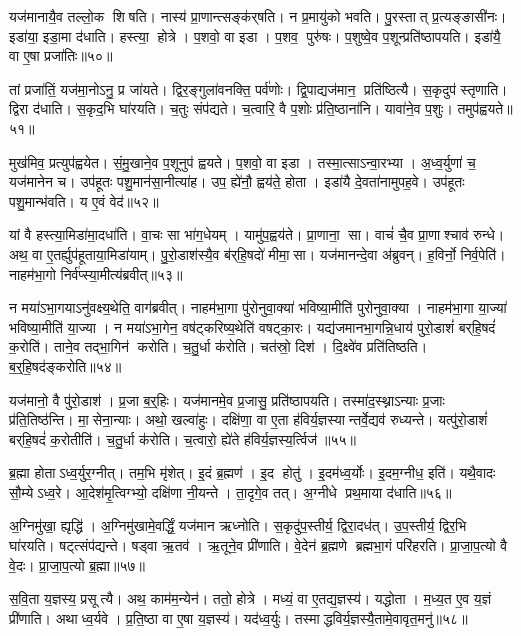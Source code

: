 यज॑मानायै॒व तल्लो॒क शिषति। नास्य॑ प्रा॒णान्त्सङ्क॑र्‌षति। न प्र॒मायु॑को भवति। पु॒रस्तात् प्र॒त्यङ्ङासी॑नः। इडा॑या॒ इडा॒मा द॑धाति। हस्त्या॒ होत्रे। प॒शवो॒ वा इडा। प॒शव॒ पुरु॑षः। प॒शुष्वे॒व प॒शून्प्रति॑ष्ठापयति। इडा॑यै॒ वा ए॒षा प्रजा॑तिः॥५०॥

तां प्रजा॑तिं॒ यज॑मा॒नोऽनु॒ प्र जा॑यते। द्विर॒ङ्गुला॑वनक्ति॒ पर्व॑णोः। द्वि॒पाद्यज॑मान॒ प्रति॑ष्ठित्यै। स॒कृदुप॑ स्तृणाति। द्विरा द॑धाति। स॒कृद॒भि घा॑रयति। च॒तुः संप॑द्यते। च॒त्वारि॒ वै प॒शोः प्र॑ति॒ष्ठाना॑नि। यावा॑ने॒व प॒शुः। तमुप॑ह्वयते॥५१॥

मुख॑मिव॒ प्रत्युप॑ह्वयेत। सं॒मु॒खाने॒व प॒शूनुप॑ ह्वयते। प॒शवो॒ वा इडा। तस्मा॒त्साऽन्वा॒रभ्या। अ॒ध्व॒र्युणा॑ च॒ यज॑मानेन च। उप॑हूतः पशु॒मान॑सा॒नीत्या॑ह। उप॒ ह्ये॑नौ॒ ह्वय॑ते॒ होता। इडा॑यै दे॒वता॑नामुपह॒वे। उप॑हूतः पशु॒मान्भ॑वति। य ए॒वं वेद॑॥५२॥

यां वै हस्त्या॒मिडा॑मा॒दधा॑ति। वा॒चः सा भा॑ग॒धेयम्। यामु॑प॒ह्वय॑ते। प्रा॒णाना॒ सा। वाचं॑ चै॒व प्रा॒णाश्चाव॑ रुन्धे। अथ॒ वा ए॒तर्ह्युप॑हूताया॒मिडा॑याम्। पु॒रो॒डाश॑स्यै॒व ब॑र्‌हि॒षदो॑ मीमा॒सा। यज॑मानन्दे॒वा अ॑ब्रुवन्। ह॒विर्नो॒ निर्व॒पेति॑। नाहम॑भा॒गो निर्व॑प्स्या॒मीत्य॑ब्रवीत्॥५३॥

न मया॑ऽभा॒गयाऽनु॑वक्ष्य॒थेति॒ वाग॑ब्रवीत्। नाहम॑भा॒गा पु॑रोनुवा॒क्या॑ भविष्या॒मीति॑ पुरोनुवा॒क्या। नाहम॑भा॒गा या॒ज्या॑ भविष्या॒मीति॑ या॒ज्या। न मया॑ऽभा॒गेन॒ वष॑ट्करिष्य॒थेति॑ वषट्का॒रः। यद्य॑जमानभा॒गन्नि॒धाय॑ पुरो॒डाशं॑ बर्‌हि॒षदं॑ क॒रोति॑। ताने॒व तद्भा॒गिन॑ करोति। च॒तु॒र्धा क॑रोति। चत॑स्रो॒ दिश॑। दि॒क्ष्वे॑व प्रति॑तिष्ठति। ब॒र्॒हि॒षद॑ङ्करोति॥५४॥

यज॑मानो॒ वै पु॑रो॒डाश॑। प्र॒जा ब॒र्॒हिः। यज॑मानमे॒व प्र॒जासु॒ प्रति॑ष्ठापयति। तस्मा॑द॒स्थ्नाऽन्याः प्र॒जाः प्र॑ति॒तिष्ठ॑न्ति। मा॒सेना॒न्याः। अथो॒ खल्वा॑हुः। दक्षि॑णा॒ वा ए॒ता ह॑विर्य॒ज्ञस्यान्तर्वे॒द्यव॑ रुध्यन्ते। यत्पु॑रो॒डाशं॑ बर्‌हि॒षदं॑ क॒रोतीति॑। च॒तु॒र्धा क॑रोति। च॒त्वारो॒ ह्ये॑ते ह॑विर्य॒ज्ञस्य॒र्त्विज॑॥५५॥

ब्र॒ह्मा होताऽध्व॒र्युर॒ग्नीत्। तम॒भि मृ॑शेत्। इ॒दं ब्र॒ह्मण॑। इ॒द होतु॑। इ॒दम॑ध्व॒र्योः। इ॒दम॒ग्नीध॒ इति॑। यथै॒वादः सौ॒म्येऽध्व॒रे। आ॒देश॑मृ॒त्विग्भ्यो॒ दक्षि॑णा नी॒यन्ते। ता॒दृगे॒व तत्। अ॒ग्नीधे प्रथ॒माया द॑धाति॥५६॥

अ॒ग्निमु॑खा॒ ह्यृद्धि॑। अ॒ग्निमु॑खामे॒वर्द्धिं॒ यज॑मान ऋध्नोति। स॒कृदु॑प॒स्तीर्य॒ द्विरा॒दध॑त्। उ॒प॒स्तीर्य॒ द्विर॒भि घा॑रयति। षट्त्संप॑द्यन्ते। षड्वा ऋ॒तव॑। ऋ॒तूने॒व प्री॑णाति। वे॒देन॑ ब्र॒ह्मणे ब्रह्मभा॒गं परि॑हरति। प्रा॒जा॒प॒त्यो वै वे॒दः। प्रा॒जा॒प॒त्यो ब्र॒ह्मा॥५७॥

स॒वि॒ता य॒ज्ञस्य॒ प्रसूत्यै। अथ॒ काम॑म॒न्येन॑। ततो॒ होत्रे। मध्यं॒ वा ए॒तद्य॒ज्ञस्य॑। यद्धोता। म॒ध्य॒त ए॒व य॒ज्ञं प्री॑णाति। अथाध्व॒र्यवे। प्र॒ति॒ष्ठा वा ए॒षा य॒ज्ञस्य॑। यद॑ध्व॒र्युः। तस्माद्धविर्य॒ज्ञस्यै॒तामे॒वावृत॒मनु॑॥५८॥

